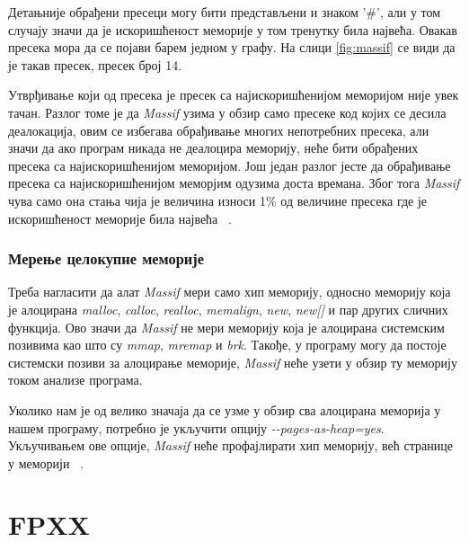 \documentclass[12pt,oneside]{memoir}
\begin{document}
\indent Детањније обрађени пресеци могу бити представљени и знаком '\#', али у том случају значи да је искоришћеност меморије у том тренутку била највећа. Овакав пресека мора да се појави барем једном у графу. На слици \ref{fig:massif} се види да је такав пресек, пресек број 14.

\indent Утврђивање који од пресека је пресек са најискоришћенијом меморијом није увек тачан. Разлог томе је да \textit{Massif} узима у обзир само пресеке код којих се десила деалокација, овим се избегава обрађивање многих непотребних пресека, али значи да ако програм никада не деалоцира меморију, неће бити обрађених пресека са најискоришћенијом меморијом. Још један разлог јесте да обрађивање пресека са најискоришћенијом меморјим одузима доста времана. Због тога \textit{Massif} чува само она стања чија је величина износи 1\% од величине пресека где је искоришћеност меморије била највећа ~\cite{massifdRef}. 

\subsection{Мерење целокупне меморије}


\indent Треба нагласити да алат \textit{Massif} мери само хип меморију, односно меморију која је алоцирана \textit{malloc}, \textit{calloc}, \textit{realloc}, \textit{memalign}, \textit{new}, \textit{new[]} и пар других сличних функција. Ово значи да \textit{Massif} не мери меморију која је алоцирана системским позивима као што су \textit{mmap}, \textit{mremap} и \textit{brk}. Такође, у програму могу да постоје системски позиви за алоцирање меморије, \textit{Massif} неће узети у обзир ту меморију током анализе програма.

\indent Уколико нам је од велико значаја да се узме у обзир сва алоцирана меморија у нашем програму, потребно је укључити опцију \textit{-\--pages-as-heap=yes}. Укључивањем ове опције, \textit{Massif} неће профајлирати хип меморију, већ странице у меморији ~\cite{massifdRef}. 


\chapter{FPXX}
\label{chp:fpxx}
\end{document}
